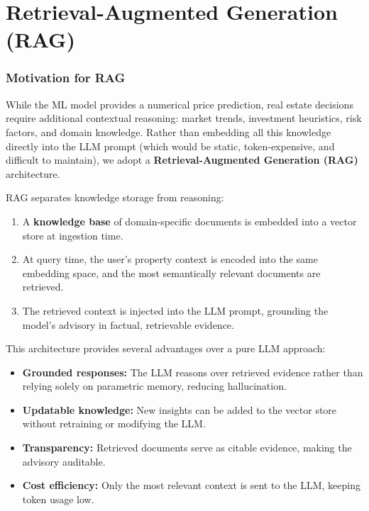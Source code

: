 \documentclass[11pt,a4paper]{article}
\begin{document}
\part{Retrieval-Augmented Generation (RAG)}

\section{Motivation for RAG}
\label{sec:rag-motivation}

While the ML model provides a numerical price prediction, real estate decisions require additional contextual reasoning: market trends, investment heuristics, risk factors, and domain knowledge.
Rather than embedding all this knowledge directly into the LLM prompt (which would be static, token-expensive, and difficult to maintain), we adopt a \textbf{Retrieval-Augmented Generation (RAG)} architecture.

RAG separates knowledge storage from reasoning:

\begin{enumerate}[leftmargin=*]
    \item A \textbf{knowledge base} of domain-specific documents is embedded into a vector store at ingestion time.
    \item At query time, the user's property context is encoded into the same embedding space, and the most semantically relevant documents are retrieved.
    \item The retrieved context is injected into the LLM prompt, grounding the model's advisory in factual, retrievable evidence.
\end{enumerate}

This architecture provides several advantages over a pure LLM approach:

\begin{itemize}[leftmargin=*]
    \item \textbf{Grounded responses:} The LLM reasons over retrieved evidence rather than relying solely on parametric memory, reducing hallucination.
    \item \textbf{Updatable knowledge:} New insights can be added to the vector store without retraining or modifying the LLM.
    \item \textbf{Transparency:} Retrieved documents serve as citable evidence, making the advisory auditable.
    \item \textbf{Cost efficiency:} Only the most relevant context is sent to the LLM, keeping token usage low.
\end{itemize}
\end{document}
